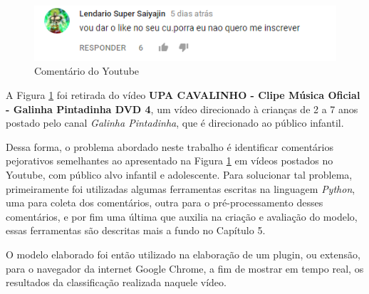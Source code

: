 \begin{figure}[H] %
	\caption{\label{fig:youtube_comment} Comentário do Youtube}
	\begin{center}
	    \includegraphics[scale=1]{figuras/figura_1.png} %
	\end{center}
\end{figure}

A Figura \ref{fig:youtube_comment} foi retirada do vídeo \textbf{UPA CAVALINHO - Clipe Música Oficial - Galinha Pintadinha DVD 4}, um vídeo direcionado à crianças de 2 a 7 anos postado pelo canal \emph{Galinha Pintadinha}, que é direcionado ao público infantil. %


Dessa forma, o problema abordado neste trabalho é identificar comentários pejorativos semelhantes ao apresentado na Figura \ref{fig:youtube_comment} em vídeos postados no Youtube, com público alvo infantil e adolescente. Para solucionar tal problema, primeiramente foi utilizadas algumas ferramentas escritas na linguagem \textit{Python}, uma para coleta dos comentários, outra para o pré-processamento desses comentários, e por fim uma última que auxilia na criação e avaliação do modelo, essas ferramentas são descritas mais a fundo no Capítulo 5. 

O modelo elaborado foi então utilizado na elaboração de um plugin, ou extensão, para o navegador da internet Google Chrome, a fim de mostrar em tempo real, os resultados da classificação realizada naquele vídeo.  %

